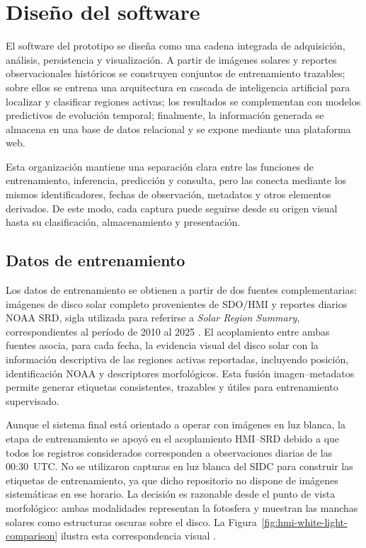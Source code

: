 \chapter[Diseño del software]{Diseño del software\label{cap:software}}

El software del prototipo se diseña como una cadena integrada de adquisición,
análisis, persistencia y visualización. A partir de imágenes solares y reportes
observacionales históricos se construyen conjuntos de entrenamiento trazables;
sobre ellos se entrena una arquitectura en cascada de inteligencia artificial para localizar y
clasificar regiones activas; los resultados se complementan con modelos
predictivos de evolución temporal; finalmente, la información generada se
almacena en una base de datos relacional y se expone mediante una plataforma web.

Esta organización mantiene una separación clara entre las funciones de
entrenamiento, inferencia, predicción y consulta, pero las conecta mediante los
mismos identificadores, fechas de observación, metadatos y otros elementos derivados.
De este modo, cada captura puede seguirse desde su origen visual hasta su
clasificación, almacenamiento y presentación.

\section{Datos de entrenamiento}

\label{sec:data-software}

Los datos de entrenamiento se obtienen a partir de dos fuentes
complementarias: imágenes de disco solar completo provenientes de SDO/HMI y
reportes diarios NOAA SRD, sigla utilizada para referirse a \textit{Solar Region
Summary}, correspondientes al período de 2010 al 2025
\citep{scherrer2012hmi,noaaSRS}. El acoplamiento entre ambas fuentes asocia,
para cada fecha, la evidencia visual del disco solar con la información
descriptiva de las regiones activas reportadas, incluyendo posición,
identificación NOAA y descriptores morfológicos. Esta fusión imagen--metadatos
permite generar etiquetas consistentes, trazables y útiles para entrenamiento
supervisado.

Aunque el sistema final está orientado a operar con imágenes en luz blanca, la
etapa de entrenamiento se apoyó en el acoplamiento HMI--SRD debido a que todos
los registros considerados corresponden a observaciones diarias de las
00:30~UTC. No se utilizaron capturas en luz blanca del SIDC para construir las
etiquetas de entrenamiento, ya que dicho repositorio no dispone de imágenes
sistemáticas en ese horario. La decisión es razonable desde el punto de vista
morfológico: ambas modalidades representan la fotosfera y muestran las manchas
solares como estructuras oscuras sobre el disco. La
Figura~\ref{fig:hmi-white-light-comparison} ilustra esta correspondencia visual
\citep{scherrer2012hmi,bobra2014sharp,zhou2023mcintosh,noaaSRS}.


